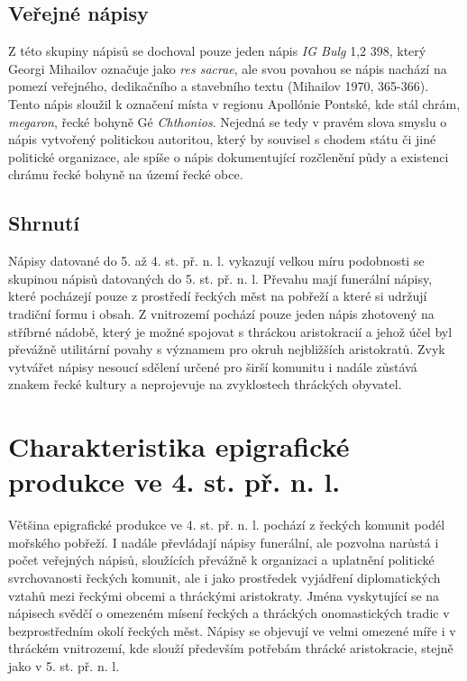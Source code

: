 \subsection[veřejné-nápisy-2]{Veřejné nápisy}

Z této skupiny nápisů se dochoval pouze jeden nápis {\em IG Bulg} 1,2 398, který Georgi Mihailov označuje jako {\em res sacrae}, ale svou povahou se nápis nachází na pomezí veřejného, dedikačního a stavebního textu (Mihailov 1970, 365-366). Tento nápis sloužil k označení místa v regionu Apollónie Pontské, kde stál chrám, {\em megaron}, řecké bohyně Gé {\em Chthonios}. Nejedná se tedy v pravém slova smyslu o nápis vytvořený politickou autoritou, který by souvisel s chodem státu či jiné politické organizace, ale spíše o nápis dokumentující rozčlenění půdy a existenci chrámu řecké bohyně na území řecké obce.

\subsection[shrnutí-6]{Shrnutí}

Nápisy datované do 5. až 4. st. př. n. l. vykazují velkou míru podobnosti se skupinou nápisů datovaných do 5. st. př. n. l. Převahu mají funerální nápisy, které pocházejí pouze z prostředí řeckých měst na pobřeží a které si udržují tradiční formu i obsah. Z vnitrozemí pochází pouze jeden nápis zhotovený na stříbrné nádobě, který je možné spojovat s thráckou aristokracií a jehož účel byl převážně utilitární povahy s významem pro okruh nejbližších aristokratů. Zvyk vytvářet nápisy nesoucí sdělení určené pro širší komunitu i nadále zůstává znakem řecké kultury a neprojevuje na zvyklostech thráckých obyvatel.

\section[charakteristika-epigrafické-produkce-ve-4.-st.-př.-n.-l.]{Charakteristika epigrafické produkce ve 4. st. př. n. l.}

Většina epigrafické produkce ve 4. st. př. n. l. pochází z řeckých komunit podél mořského pobřeží. I nadále převládají nápisy funerální, ale pozvolna narůstá i počet veřejných nápisů, sloužících převážně k organizaci a uplatnění politické svrchovanosti řeckých komunit, ale i jako prostředek vyjádření diplomatických vztahů mezi řeckými obcemi a thráckými aristokraty. Jména vyskytující se na nápisech svědčí o omezeném mísení řeckých a thráckých onomastických tradic v bezprostředním okolí řeckých měst. Nápisy se objevují ve velmi omezené míře i v thráckém vnitrozemí, kde slouží především potřebám thrácké aristokracie, stejně jako v 5. st. př. n. l.

